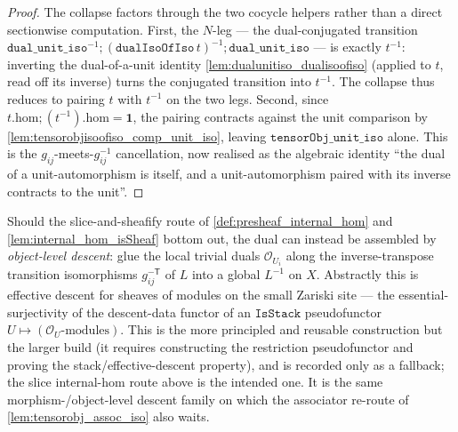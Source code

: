 \begin{proof}
  \leanok
  The collapse factors through the two cocycle helpers rather than a direct sectionwise computation.
  First, the \(N\)-leg --- the dual-conjugated transition
  \(\mathtt{dual\_unit\_iso}^{-1} \mathbin{;} (\mathtt{dualIsoOfIso}\,t)^{-1} \mathbin{;}
  \mathtt{dual\_unit\_iso}\) --- is exactly \(t^{-1}\): inverting the dual-of-a-unit identity
  \cref{lem:dualunitiso_dualisoofiso} (applied to \(t\), read off its inverse) turns the conjugated
  transition into \(t^{-1}\). The collapse thus reduces to pairing \(t\) with \(t^{-1}\) on the two
  legs. Second, since \(t.\mathrm{hom} \mathbin{;} (t^{-1}).\mathrm{hom} = \mathbf 1\), the pairing
  contracts against the unit comparison by \cref{lem:tensorobjisoofiso_comp_unit_iso}, leaving
  \(\mathtt{tensorObj\_unit\_iso}\) alone. This is the \(g_{ij}\)-meets-\(g_{ij}^{-1}\) cancellation,
  now realised as the algebraic identity ``the dual of a unit-automorphism is itself, and a
  unit-automorphism paired with its inverse contracts to the unit''.
\end{proof}

\begin{remark}
  \label{rem:dual_via_stack}
  Should the slice-and-sheafify route of
  \cref{def:presheaf_internal_hom} and \cref{lem:internal_hom_isSheaf} bottom out, the dual can
  instead be assembled by \emph{object-level descent}: glue the local trivial duals
  \(\mathcal{O}_{U_i}\) along the inverse-transpose transition isomorphisms
  \(g_{ij}^{-\mathsf{T}}\) of \(L\) into a global \(L^{-1}\) on \(X\). Abstractly this
  is effective descent for sheaves of modules on the small Zariski site --- the
  essential-surjectivity of the descent-data functor of an \(\mathtt{IsStack}\)
  pseudofunctor \(U \mapsto (\mathcal{O}_U\text{-modules})\). This is the more
  principled and reusable construction but the larger build (it requires constructing
  the restriction pseudofunctor and proving the stack/effective-descent property),
  and is recorded only as a fallback; the slice internal-hom route above is the
  intended one. It is the same morphism-/object-level descent family on which the
  associator re-route of \cref{lem:tensorobj_assoc_iso} also waits.
\end{remark}

